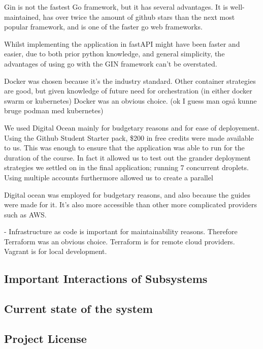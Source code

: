 Gin is not the fastest Go framework, but it has several advantages. It is well-maintained, has over twice the amount of github stars than the next most popular framework, and is one of the faster go web frameworks.

Whilst implementing the application in fastAPI might have been faster and easier, due to both prior python knowledge, and general simplicity, the advantages of using go with the GIN framework can't be overstated. 


Docker was chosen because it's the industry standard. Other container strategies are good, but given knowledge of future need for orchestration (in either docker swarm or kubernetes) Docker was an obvious choice.  (ok I guess man også kunne bruge podman med kubernetes)

We used Digital Ocean mainly for budgetary reasons and for ease of deployement. Using the Github Student Starter pack, \$200 in free credits were made available to us. This was enough to ensure that the application was able to run for the duration of the course. In fact it allowed us to test out the grander deployment strategies we settled on in the final application; running 7 concurrent droplets. Using multiple accounts furthermore allowed us to create a parallel  


Digital ocean was employed for budgetary reasons, and also because the guides were made for it.
It's also more accessible than other more complicated providers such as AWS. 


- Infrastructure as code is important for maintainability reasons. Therefore Terraform was an obvious choice.
Terraform is for remote cloud providers. Vagrant is for local development. 

\subsection{Important Interactions of Subsystems}

\subsection{Current state of the system}

\subsection{Project License}
